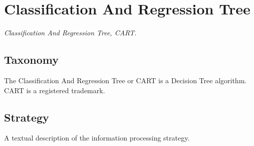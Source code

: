 

\section{Classification And Regression Tree}
\label{sec:cart}

\emph{Classification And Regression Tree, CART.}

\subsection{Taxonomy}
The Classification And Regression Tree or CART is a Decision Tree algorithm. CART is a registered trademark.

\subsection{Strategy}
A textual description of the information processing strategy.



